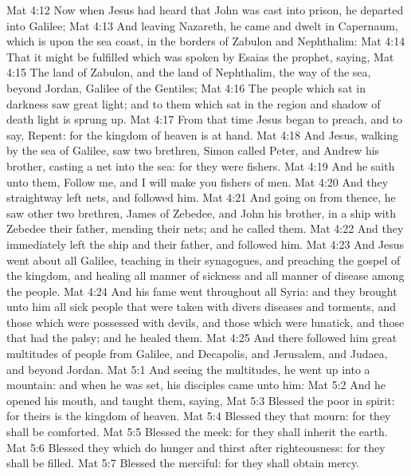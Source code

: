 \vs Mat 4:12 Now when Jesus had heard that John was cast into prison, he departed into Galilee;
\vs Mat 4:13 And leaving Nazareth, he came and dwelt in Capernaum, which is upon the sea coast, in the borders of Zabulon and Nephthalim:
\vs Mat 4:14 That it might be fulfilled which was spoken by Esaias the prophet, saying,
\vs Mat 4:15 The land of Zabulon, and the land of Nephthalim,  the way of the sea, beyond Jordan, Galilee of the Gentiles;
\vs Mat 4:16 The people which sat in darkness saw great light; and to them which sat in the region and shadow of death light is sprung up.
\vs Mat 4:17 From that time Jesus began to preach, and to say, Repent: for the kingdom of heaven is at hand.
\vs Mat 4:18 And Jesus, walking by the sea of Galilee, saw two brethren, Simon called Peter, and Andrew his brother, casting a net into the sea: for they were fishers.
\vs Mat 4:19 And he saith unto them, Follow me, and I will make you fishers of men.
\vs Mat 4:20 And they straightway left  nets, and followed him.
\vs Mat 4:21 And going on from thence, he saw other two brethren, James  of Zebedee, and John his brother, in a ship with Zebedee their father, mending their nets; and he called them.
\vs Mat 4:22 And they immediately left the ship and their father, and followed him.
\vs Mat 4:23 And Jesus went about all Galilee, teaching in their synagogues, and preaching the gospel of the kingdom, and healing all manner of sickness and all manner of disease among the people.
\vs Mat 4:24 And his fame went throughout all Syria: and they brought unto him all sick people that were taken with divers diseases and torments, and those which were possessed with devils, and those which were lunatick, and those that had the palsy; and he healed them.
\vs Mat 4:25 And there followed him great multitudes of people from Galilee, and  Decapolis, and  Jerusalem, and  Judaea, and  beyond Jordan.
\vs Mat 5:1 And seeing the multitudes, he went up into a mountain: and when he was set, his disciples came unto him:
\vs Mat 5:2 And he opened his mouth, and taught them, saying,
\vs Mat 5:3 Blessed  the poor in spirit: for theirs is the kingdom of heaven.
\vs Mat 5:4 Blessed  they that mourn: for they shall be comforted.
\vs Mat 5:5 Blessed  the meek: for they shall inherit the earth.
\vs Mat 5:6 Blessed  they which do hunger and thirst after righteousness: for they shall be filled.
\vs Mat 5:7 Blessed  the merciful: for they shall obtain mercy.
